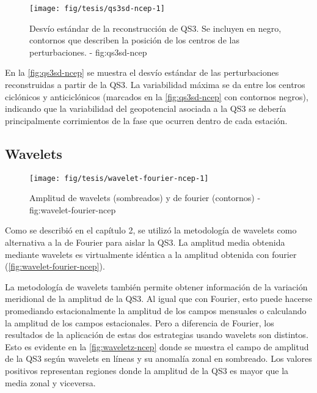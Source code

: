 \documentclass[spanish,a4paper]{book}
\begin{document}
\begin{figure*}
\texttt{[image: fig/tesis/qs3sd-ncep-1]} \caption{Desvío estándar de la reconstrucción de QS3. Se incluyen en negro, contornos que describen la posición de los centros de las perturbaciones. - fig:qs3sd-ncep}\label{fig:qs3sd-ncep}
\end{figure*}

En la \autoref{fig:qs3sd-ncep} se muestra el desvío estándar de las
perturbaciones reconstruidas a partir de la QS3. La variabilidad máxima
se da entre los centros ciclónicos y anticiclónicos (marcados en la
\autoref{fig:qs3sd-ncep} con contornos negros), indicando que la
variabilidad del geopotencial asociada a la QS3 se debería
principalmente corrimientos de la fase que ocurren dentro de cada
estación.

\subsection{Wavelets}\label{wavelets}

\begin{figure}

{\centering \texttt{[image: fig/tesis/wavelet-fourier-ncep-1]} 

}

\caption{Amplitud de wavelets (sombreados) y de fourier (contornos) - fig:wavelet-fourier-ncep}\label{fig:wavelet-fourier-ncep}
\end{figure}

Como se describió en el capítulo 2, se utilizó la metodología de
wavelets como alternativa a la de Fourier para aislar la QS3. La
amplitud media obtenida mediante wavelets
 es virtualmente idéntica a la
amplitud obtenida con fourier (\autoref{fig:wavelet-fourier-ncep}).

La metodología de wavelets también permite obtener información de la
variación meridional de la amplitud de la QS3. Al igual que con Fourier,
esto puede hacerse promediando estacionalmente la amplitud de los campos
mensuales o calculando la amplitud de los campos estacionales. Pero a
diferencia de Fourier, los resultados de la aplicación de estas dos
estrategias usando wavelets son distintos. Esto es evidente en la
\autoref{fig:waveletz-ncep} donde se muestra el campo de amplitud de la
QS3 según wavelets en líneas y su anomalía zonal en sombreado. Los
valores positivos representan regiones donde la amplitud de la QS3 es
mayor que la media zonal y viceversa.
\end{document}
